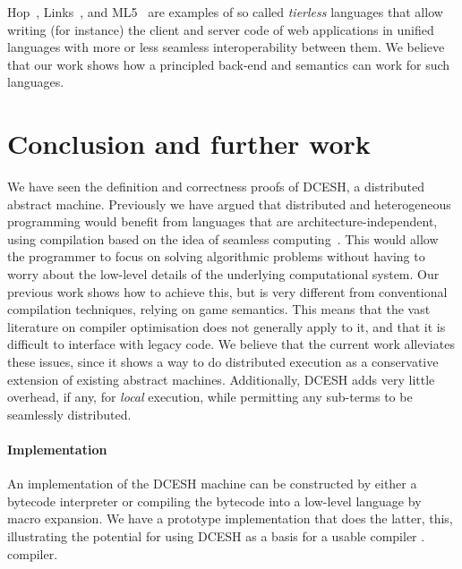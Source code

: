 \documentclass{article}
\theoremstyle{definition}
\newcommand{\DCESHn}{DCESH}
\begin{document}
Hop~\cite{DBLP:conf/oopsla/SerranoGL06}, Links~\cite{DBLP:conf/fmco/CooperLWY06},
and ML5~\cite{DBLP:conf/tgc/VIICH07}
are examples of so called
\emph{tierless} languages that allow writing (for instance) the client and
server code of web applications in unified languages with more or less
seamless interoperability between them. We believe that our work shows
how a principled back-end and semantics can work for such languages.


\section{Conclusion and further work}
We have seen the definition and correctness proofs of \DCESHn{}, a distributed
abstract machine. Previously we have argued that distributed and heterogeneous
programming would benefit from languages that are architecture-independent,
using compilation based on the idea of seamless
computing~\cite{DBLP:conf/lics/FredrikssonG13}. This would allow the programmer
to focus on solving algorithmic problems without having to worry about the
low-level details of the underlying computational system. Our previous work
shows how to achieve this, but is very different from conventional compilation
techniques, relying on game semantics. This means that the vast literature on compiler optimisation does
not generally apply to it, and that it is difficult to interface with legacy
code.  We believe that the current work alleviates these issues, since it shows
a way to do distributed execution as a conservative extension of existing
abstract machines.  Additionally, \DCESHn{} adds very little overhead, if any,
for \emph{local} execution, while permitting any sub-terms to be seamlessly
distributed.



\paragraph*{Implementation}
An implementation of the \DCESHn{} machine can be constructed by 
\iffullversion
either a bytecode
interpreter or 
\fi
compiling the bytecode into a low-level language by macro expansion.  We have a
prototype implementation that does
\iffullversion
the latter,
\else
this,
\fi
illustrating the potential for
using \DCESHn{} as a basis for a usable 
\ifnotfullversion
compiler \cite{SourceCode}.
\else
compiler.
\fi
\end{document}
